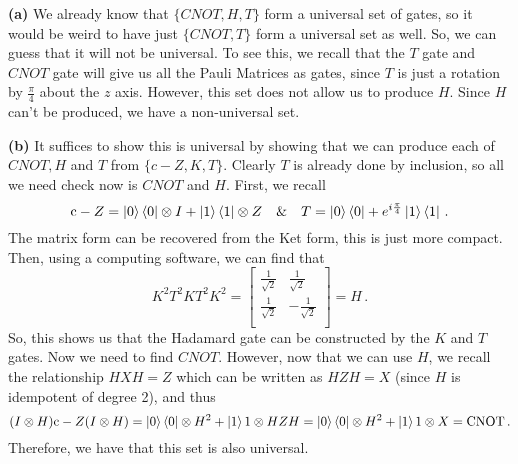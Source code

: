 \documentclass[10pt]{article}
\begin{document}
\textbf{(a)} We already know that $\{CNOT, H, T\}$ form a universal set of gates, so it would be weird to have just $\{CNOT, T\}$ form a universal set as well. So, we can guess that it will not be universal. To see this, we recall that the $T$ gate and $CNOT$ gate will give us all the Pauli Matrices as gates, since $T$ is just a rotation by $\frac{\pi}{4}$ about the $z$ axis. However, this set does not allow us to produce $H$. Since $H$ can't be produced, we have a non-universal set.

\textbf{(b)} It suffices to show this is universal by showing that we can produce each of $CNOT, H$ and $T$ from $\{c-Z,K,T\}$. Clearly $T$ is already done by inclusion, so all we need check now is $CNOT$ and $H$. First, we recall
\[ \text{c}-Z = \ket{0}\bra{0}\otimes I + \ket{1}\bra{1}\otimes Z \quad \& \quad T = \ket{0}\bra{0} + e^{i\frac{\pi}{4}}\ket{1}\bra{1}\, .\]
The matrix form can be recovered from the Ket form, this is just more compact. Then, using a computing software, we can find that
\[ K^{2}T^{2}KT^{2}K^{2} =
\begin{bmatrix}
  \frac{1}{\sqrt{2}} & \frac{1}{\sqrt{2}} \\
  \frac{1}{\sqrt{2}} & -\frac{1}{\sqrt{2}} \\
\end{bmatrix}
= H \, .\]
So, this shows us that the Hadamard gate can be constructed by the $K$ and $T$ gates. Now we need to find $CNOT$. However, now that we can use $H$, we recall the relationship $HXH = Z$ which can be written as $HZH = X$ (since $H$ is idempotent of degree 2), and thus
\[ (I\otimes H)\text{c}-Z(I\otimes H) = \ket{0}\bra{0}\otimes H^{2} + \ket{1}{1}\otimes HZH = \ket{0}\bra{0}\otimes H^{2} + \ket{1}{1}\otimes X = \text{CNOT}\, .\]
Therefore, we have that this set is also universal.
\end{document}
